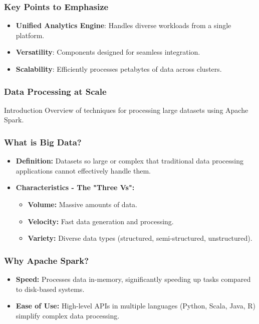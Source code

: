 \documentclass[aspectratio=169]{beamer}
\begin{document}
\begin{frame}
    \frametitle{Key Points to Emphasize}
    \begin{itemize}
        \item \textbf{Unified Analytics Engine}: Handles diverse workloads from a single platform.
        \item \textbf{Versatility}: Components designed for seamless integration.
        \item \textbf{Scalability}: Efficiently processes petabytes of data across clusters.
    \end{itemize}
\end{frame}

\begin{frame}
    \frametitle{Data Processing at Scale}
    \begin{block}{Introduction}
        Overview of techniques for processing large datasets using Apache Spark.
    \end{block}
\end{frame}

\begin{frame}
    \frametitle{What is Big Data?}
    \begin{itemize}
        \item \textbf{Definition:} Datasets so large or complex that traditional data processing applications cannot effectively handle them.
        \item \textbf{Characteristics - The "Three Vs":}
        \begin{itemize}
            \item \textbf{Volume:} Massive amounts of data.
            \item \textbf{Velocity:} Fast data generation and processing.
            \item \textbf{Variety:} Diverse data types (structured, semi-structured, unstructured).
        \end{itemize}
    \end{itemize}
\end{frame}

\begin{frame}
    \frametitle{Why Apache Spark?}
    \begin{itemize}
        \item \textbf{Speed:} Processes data in-memory, significantly speeding up tasks compared to disk-based systems.
        \item \textbf{Ease of Use:} High-level APIs in multiple languages (Python, Scala, Java, R) simplify complex data processing.
    \end{itemize}
\end{frame}
\end{document}
